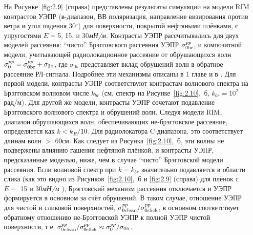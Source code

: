 На Рисунке~\ref{fig:2.9} (справа) представлены результаты симуляции на модели RIM контрастов УЭПР (в-диапазон, ВВ поляризация, направление визирования против ветра и угол падения 30${}^\circ$) для поверхности, покрытой нефтяными плёнками, с упругостями $E=$5, 15, и 30\textit{мН/м.} Контрасты УЭПР рассчитывались для двух моделей рассеяния: ``чисто'' Брэгговского рассеяния УЭПР ${\rm \sigma }_{0{\rm br}}^{pp} $, и композитной модели, учитывающей радиолокационное рассеяние от обрушающихся волн ${\rm \sigma }_{0}^{pp} ={\rm \sigma }_{0{\rm br}}^{pp} +{\rm \sigma }_{0{\rm b}} $, где $\sigma _{0b} $ представляет вклад обрушений волн в обратное рассеяние РЛ-сигнала. Подробнее эти механизмы описаны в 1 главе и в \citep{Kudryavtsev2005}. Для первой модели, контрасты УЭПР соответствуют контрастам волнового спектра на Брэгговском волновом числе $k_{br} $ (см. спектр на Рисунке~\ref{fig:2.10},~б, $k_{br} =10^{2} $рад/м). Для другой же модели, контрасты УЭПР сочетают подавление Брэгговского волнового спектра и обрушений волн. Следуя модели RIM, диапазон обрушающихся волн, обеспечивающих не-брэгговское рассеяние, определяется как $k<k_{R} /10$. Для радиолокатора C-диапазона, это соответствует длинам волн $>$ 60см. Как следует из Рисунка~\ref{fig:2.10},~б, эти волны не подвержены влиянию гашения нефтяной плёнкой, и контрасты УЭПР, предсказанные моделью, ниже, чем в случае ``чисто'' Брэгговской модели рассеяния. Если волновой спектр при $k=k_{br} $ значительно подавляется в области слика (как это видно из Рисунков~\ref{fig:2.10},~б и \ref{fig:2.9} (справа) для плёнок с $E=$ 15 и 30\textit{мН/м }), Брэгговский механизм рассеяния отключается и УЭПР формируется в основном за счёт обрушений. В таком случае, отношение УЭПР для чистой и сликовой поверхностей, ${\rm \sigma }_{0{\rm clean}}^{pp} /{\rm \sigma }_{0{\rm slick}}^{pp} $, в основном соответствует обратному отношению не-Брэгговской УЭПР к полной УЭПР чистой поверхности, т.е. ${\rm \sigma }_{0{\rm clean}}^{pp} /{\rm \sigma }_{0{\rm slick}}^{pp} \approx {\rm \sigma }_{0}^{pp} /{\rm \sigma }_{0{\rm b}} $.


